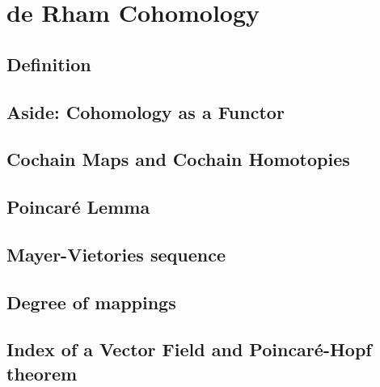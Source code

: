 
\section{de Rham Cohomology}
\label{Section4}

\subsection{Definition}

\subsection{Aside: Cohomology as a Functor}

\subsection{Cochain Maps and Cochain Homotopies}

\subsection{Poincaré Lemma}

\subsection{Mayer-Vietories sequence}

\subsection{Degree of mappings}

\subsection{Index of a Vector Field and Poincaré-Hopf theorem}

\cleardoublepage

